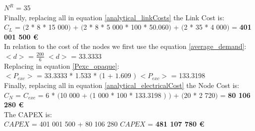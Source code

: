 $N^R$ = 35\\

Finally, replacing all in equation \ref{analytical_linkCosts} the Link Cost is:\\

$C_L$ = $($2 * 8 * 15 000$)$ + $($2 * 8 * 5 000 * 100 * 50.060$)$ + $($2 * 35 * 4 000$)$ = \textbf{401 001 500 \euro}\\

In relation to the cost of the nodes we first use the equation \ref{average_demand}:\\

$<d>$ = $\frac{200}{6}$ \qquad \qquad $<d>$ = 33.3333\\

Replacing in equation \ref{Pexc_opaque}:\\

$<P_{exc}>$ = 33.3333 * 1.533 * $($1 + $1.609$ $)$ \qquad \qquad $<P_{exc}>$ = 133.3198 \\

Finally, replacing all in equation \ref{analytical_electricalCost} the Node Cost is:\\

$C_N$ = $C_{exc}$ = 6 * $($10 000 + $($1 000 * 100 * 133.3198 $)$ $)$ + $($20 * 2 720$)$ = \textbf{80 106 280 \euro}\\

The CAPEX is:\\

$CAPEX$ = 401 001 500 + 80 106 280 \qquad \qquad $CAPEX$ = \textbf{481 107 780 \euro}
